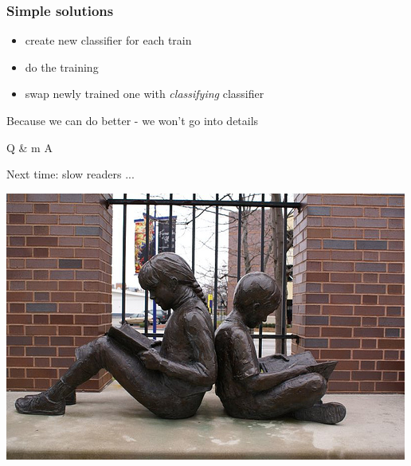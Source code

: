 \documentclass{beamer}
\begin{document}
\begin{frame}
\frametitle{Simple solutions}

\begin{itemize}
 \item create new classifier for each train
 \item do the training
 \item swap newly trained one with \emph{classifying} classifier
\end{itemize}

\pause
\textcolor{RawSienna}{Because we can do better - we won't go into details}

\end{frame}

\begin{frame}
\begin{center}
\Huge{Q \& m A}
\end{center}

\end{frame}

\begin{frame}

Next time: slow readers ...

\begin{center}
\includegraphics[scale=0.5]{slow_readers.jpg} 

\end{center}
\end{frame}
\end{document}
